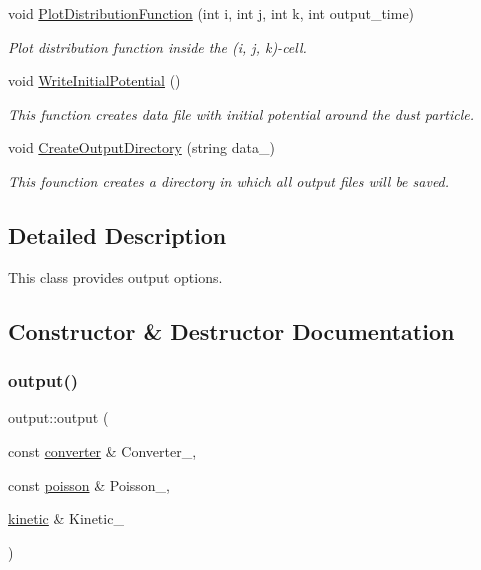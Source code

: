 \begin{DoxyCompactItemize}
void \mbox{\hyperlink{classoutput_a6741e4645701f96a3b9174fb5ab9dd54}{Plot\+Distribution\+Function}} (int i, int j, int k, int output\+\_\+time)
\begin{DoxyCompactList}\small\item\em Plot distribution function inside the (i, j, k)-\/cell. \end{DoxyCompactList}\item 
void \mbox{\hyperlink{classoutput_ade7c2bfb9b6276529405d60ed59e5fb1}{Write\+Initial\+Potential}} ()
\begin{DoxyCompactList}\small\item\em This function creates data file with initial potential around the dust particle. \end{DoxyCompactList}\item 
void \mbox{\hyperlink{classoutput_ad0585ef8d22cf587dfe95acb9445bab8}{Create\+Output\+Directory}} (string data\+\_\+)
\begin{DoxyCompactList}\small\item\em This founction creates a directory in which all output files will be saved. \end{DoxyCompactList}\end{DoxyCompactItemize}


\subsection{Detailed Description}
This class provides output options. 

\subsection{Constructor \& Destructor Documentation}
\mbox{\label{classoutput_ac5bcde3beae53d810e9e876d41bea2ac}} 
\subsubsection{\texorpdfstring{output()}{output()}}
{\footnotesize\ttfamily output\+::output (\begin{DoxyParamCaption}\item[{const \mbox{\hyperlink{classconverter}{converter}} \&}]{Converter\+\_\+,  }\item[{const \mbox{\hyperlink{classpoisson}{poisson}} \&}]{Poisson\+\_\+,  }\item[{\mbox{\hyperlink{classkinetic}{kinetic}} \&}]{Kinetic\+\_\+ }\end{DoxyParamCaption})}



